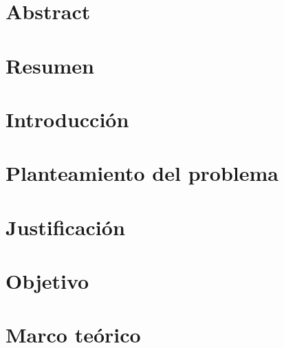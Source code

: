 \documentclass[stu, 12pt, noextraspace, floatsintext]{apa7}
\begin{document}
\setcounter{page}{3} %

\renewcommand{\contentsname}{Índice general}
\tableofcontents %

\clearpage
\let\oldnumberline\numberline %
\renewcommand{\numberline}[1]{\hspace*{-1.5em}} %
\listoffigures %
\let\numberline\oldnumberline %


\clearpage
\section*{Abstract} %


\clearpage
\section*{Resumen} %


\clearpage
\section{Introducción}


\clearpage
\section{Planteamiento del problema}


\clearpage
\section{Justificación}


\clearpage
\section{Objetivo}


\clearpage
\section{Marco teórico}

\end{document}
